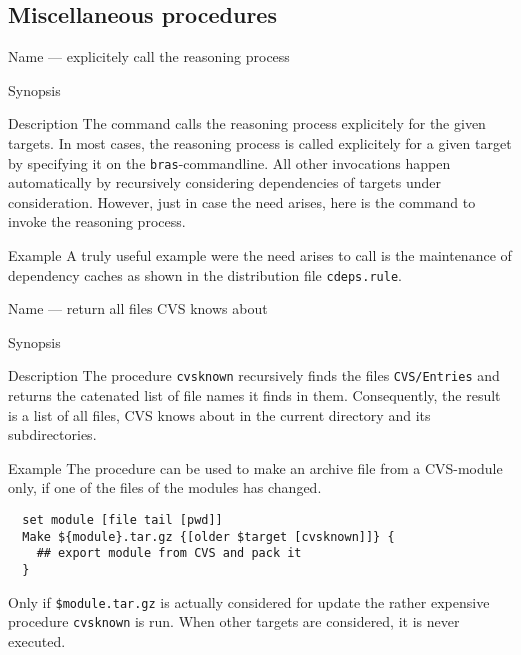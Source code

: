 \documentclass[11pt]{scrartcl}
\newcommand{\bras}{\texttt{bras}}
\begin{document}
\subsection{Miscellaneous procedures}

\begin{Describe}
\item[Name]  --- explicitely call the reasoning
  process 
\item[Synopsis]  
\item[Description] The command calls the reasoning process explicitely
  for the given targets. In most cases, the reasoning process is
  called explicitely for a given target by specifying it on the
  \bras-commandline. All other invocations happen automatically by
  recursively considering dependencies of targets under consideration.
  However, just in case the need arises, here is the command to invoke
  the reasoning process.
\item[Example] A truly useful example were the need arises to call
   is the maintenance of dependency caches as shown in
  the distribution file \texttt{cdeps.rule}.
\end{Describe}

\begin{Describe}
\item[Name]  --- return all files CVS knows about
\item[Synopsis] 
\item[Description] The procedure \texttt{cvsknown} recursively finds
  the files \texttt{CVS/Entries} and returns the catenated list of
  file names it finds in them. Consequently, the result is a list of
  all files, CVS knows about in the current directory and its
  subdirectories.
\item[Example]
The procedure can be used to make an archive file from a CVS-module
only, if one of the files of the modules has changed. 
\begin{verbatim}
  set module [file tail [pwd]]
  Make ${module}.tar.gz {[older $target [cvsknown]]} {
    ## export module from CVS and pack it
  }
\end{verbatim}
Only if \texttt{\$module.tar.gz} is actually considered for update the
rather expensive procedure \texttt{cvsknown} is run. When other
targets are considered, it is never executed.
\end{Describe}
\end{document}
